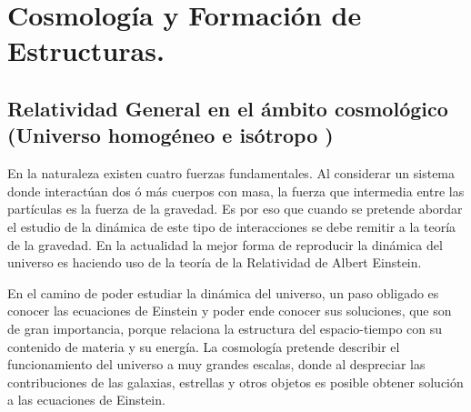 



\chapter{Cosmología y Formación de Estructuras.}
\label{cha:Theoretical Framework}

\section{Relatividad General en el ámbito cosmológico (Universo homogéneo e isótropo )}
\label{sec:IsotropicAndHomogeneousUniverse}
En la naturaleza existen cuatro fuerzas fundamentales. Al considerar un sistema donde interactúan  dos ó más cuerpos con masa, la fuerza que intermedia entre las partículas  es la fuerza de la gravedad. Es por eso que cuando se pretende abordar el estudio de la dinámica de este tipo de interacciones se debe remitir a la teoría de la gravedad. En la actualidad la mejor forma de reproducir la dinámica del universo es haciendo uso de la teoría de la Relatividad de Albert Einstein.

En el camino de poder estudiar la dinámica del universo, un  paso obligado es conocer las ecuaciones de Einstein y poder ende conocer sus soluciones, que son de gran importancia, porque relaciona la estructura del espacio-tiempo con su contenido de materia y su energía. 
La cosmología pretende  describir el funcionamiento del universo a muy grandes escalas, donde al despreciar las contribuciones de las galaxias, estrellas y otros objetos es posible obtener solución a las ecuaciones de Einstein.

